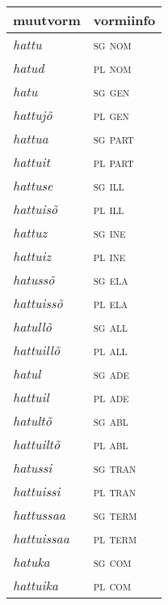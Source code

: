 \documentclass[12pt,a4paper]{article}
\begin{document}
\begin{table}[H] %
      \footnotesize
  \begin{minipage}[t]{.40\textwidth}
    \begin{tabular}[t]{l l}
      muutvorm            & vormiinfo \\ \hline
      \textit{hattu}      & \textsc{sg nom} \\
      \textit{hatud}      & \textsc{pl nom} \\
      \textit{hatu}       & \textsc{sg gen} \\
      \textit{hattujõ}    & \textsc{pl gen} \\
      \textit{hattua}     & \textsc{sg part} \\
      \textit{hattuit}    & \textsc{pl part} \\
      \textit{hattuse}    & \textsc{sg ill} \\
      \textit{hattuisõ}   & \textsc{pl ill} \\
      \textit{hattuz}     & \textsc{sg ine} \\
      \textit{hattuiz}    & \textsc{pl ine} \\
      \textit{hatussõ}    & \textsc{sg ela} \\
      \textit{hattuissõ}  & \textsc{pl ela} \\
      \textit{hatullõ}    & \textsc{sg all} \\
      \textit{hattuillõ}  & \textsc{pl all} \\
      \textit{hatul}      & \textsc{sg ade} \\
      \textit{hattuil}    & \textsc{pl ade} \\
      \textit{hatultõ}    & \textsc{sg abl} \\
      \textit{hattuiltõ}  & \textsc{pl abl} \\
      \textit{hatussi}    & \textsc{sg tran} \\
      \textit{hattuissi}  & \textsc{pl tran} \\
      \textit{hattussaa}  & \textsc{sg term} \\
      \textit{hattuissaa} & \textsc{pl term} \\
      \textit{hatuka}     & \textsc{sg com} \\
      \textit{hattuika}   & \textsc{pl com} \\
    \end{tabular}

\end{minipage}
\end{table}
\end{document}
